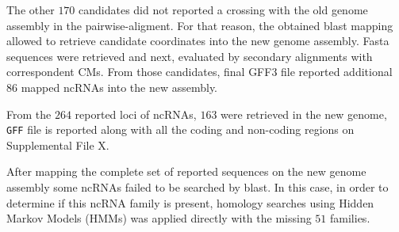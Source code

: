 \documentclass[11pt]{article}
\begin{document}
The other $170$ candidates did not reported a crossing with the old genome
assembly in the pairwise-aligment. For that reason, the obtained blast 
mapping allowed to retrieve candidate coordinates into the new genome
assembly. Fasta sequences were retrieved and next, evaluated by secondary
alignments with correspondent CMs. From those candidates, final GFF3 file
reported additional $86$ mapped ncRNAs into the new assembly.

From the $264$ reported loci of ncRNAs, $163$ were retrieved in the
new genome, \texttt{GFF} file is reported along with all the coding and non-coding
regions on Supplemental File X.

After mapping the complete set of reported sequences on the new genome assembly
some ncRNAs failed to be searched by blast. In this case, in order to
determine if this ncRNA family is present, homology searches using 
Hidden Markov Models (HMMs) was applied directly with the missing $51$ families.
\end{document}
